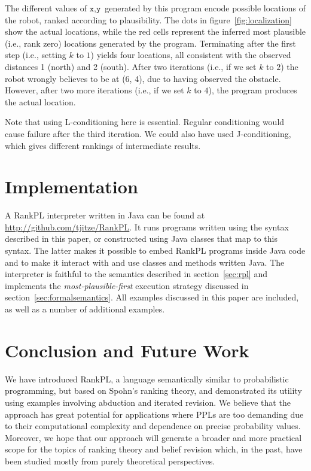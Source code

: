 \documentclass{llncs}
\begin{document}
The different values of $\texttt{x},\texttt{y}$ generated by this program encode possible locations of the robot, ranked according to plausibility.
The dots in figure~\ref{fig:localization} show the actual locations, while the red cells represent the inferred most plausible (i.e., rank zero) locations generated by the program.
Terminating after the first step (i.e., setting $k$ to $1$) yields four locations, all consistent with the observed distances 1 (north) and 2 (south).
After two iterations (i.e., if we set $k$ to $2$) the robot wrongly believes to be at (6, 4), due to having observed the obstacle.
However, after two more iterations (i.e., if we set $k$ to $4$), the program produces the actual location.

Note that using L-conditioning here is essential.
Regular conditioning would cause failure after the third iteration. 
We could also have used J-conditioning, which gives different rankings of intermediate results.

\section{Implementation}\label{sec:implementation}

A RankPL interpreter written in Java can be found at \url{http://github.com/tjitze/RankPL}.
It runs programs written using the syntax described in this paper, 
	or constructed using Java classes that map to this syntax.
The latter makes it possible to embed RankPL programs inside Java code
	and to make it interact with and use classes and methods written Java.
The interpreter is faithful to the semantics described in section~\ref{sec:rpl} and
	implements the \emph{most-plausible-first} execution strategy discussed in section~\ref{sec:formalsemantics}.
All examples discussed in this paper are included, as well as a number of additional examples.

\section{Conclusion and Future Work}\label{sec:conclusion}

We have introduced RankPL, a language semantically similar to probabilistic programming,
	but based on Spohn's ranking theory,
	and demonstrated its utility using examples involving abduction and iterated revision.
We believe that the approach has great potential for applications
	where PPLs are too demanding due to their computational complexity and dependence on precise probability values.
Moreover, we hope that our approach will generate a broader and more practical scope for the topics of 
	ranking theory and belief revision which, in the past, have been studied mostly from purely theoretical perspectives.
\end{document}
